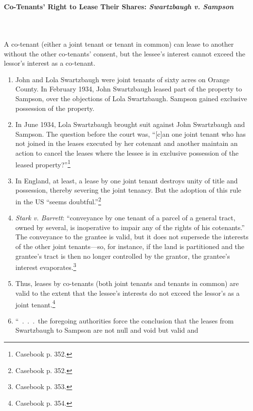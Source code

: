 \paragraph{Co-Tenants' Right to Lease Their Shares: \emph{Swartzbaugh v. 
Sampson}}
~\\\\
A co-tenant (either a joint tenant or tenant in common)  can lease to another 
without the other co-tenants' consent, but the lessee's interest cannot exceed 
the lessor's interest as a co-tenant.

\begin{enumerate}
    \item John and Lola Swartzbaugh were joint tenants of sixty acres on 
    Orange County. In February 1934, John Swartzbaugh leased part of the 
    property to Sampson, over the objections of Lola Swartzbaugh. Sampson 
    gained exclusive possession of the property.
    \item In June 1934, Lola Swartzbaugh brought suit against John Swartzbaugh 
    and Sampson. The question before the court was, ``[c]an one joint tenant 
    who has not joined in the leases executed by her cotenant and another 
    maintain an action to cancel the leases where the lessee is in exclusive 
    possession of the leased property?''\footnote{Casebook p. 352.}
    \item In England, at least, a lease by one joint tenant destroys unity of 
    title and possession, thereby severing the joint tenancy. But the adoption 
    of this rule in the US ``seems doubtful.''\footnote{Casebook p. 352.}
    \item \emph{Stark v. Barrett}: ``conveyance by one tenant of a parcel of a 
    general tract, owned by several, is inoperative to impair any of the 
    rights of his cotenants.'' The conveyance to the grantee is valid, but it 
    does not supersede the interests of the other joint tenants---so, for 
    instance, if the land is partitioned and the grantee's tract is then no 
    longer controlled by the grantor, the grantee's interest 
    evaporates.\footnote{Casebook p. 353.}
    \item Thus, leases by co-tenants (both joint tenants and tenants in 
    common) are valid to the extent that the lessee's interests do not exceed 
    the lessor's as a joint tenant.\footnote{Casebook p. 354.}
    \item ``~.~.~.~the foregoing authorities force the conclusion that the 
    leases from Swartzbaugh to Sampson are not null and void but valid and 

\end{enumerate}
